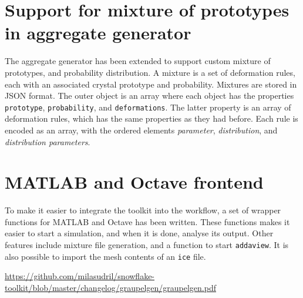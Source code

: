 \documentclass[a4paper,10pt]{scrartcl}
\begin{document}
\section{Support for mixture of prototypes in aggregate generator}
The aggregate generator has been extended to support custom mixture of prototypes, and probability distribution. A mixture is a set of deformation rules, each with an associated crystal prototype and probability. Mixtures are stored in JSON format. The outer object is an array where each object has the properties \texttt{prototype}, \texttt{probability}, and \texttt{deformations}. The latter property is an array of deformation rules, which has the same properties as they had before. Each rule is encoded as an array, with the ordered elements \textit{parameter}, \textit{distribution}, and \textit{distribution parameters}.

\section{MATLAB and Octave frontend}
To make it easier to integrate the toolkit into the workflow, a set of wrapper functions for MATLAB and Octave has been written. These functions makes it easier to start a simulation, and when it is done, analyse its output. Other features include mixture file generation, and a function to start \texttt{addaview}. It is also possible to import the mesh contents of an \texttt{ice} file.

\begin{thebibliography}{9}
 \url{https://github.com/milasudril/snowflake-toolkit/blob/master/changelog/graupelgen/graupelgen.pdf}
\end{thebibliography}
\vfill
\end{document}
